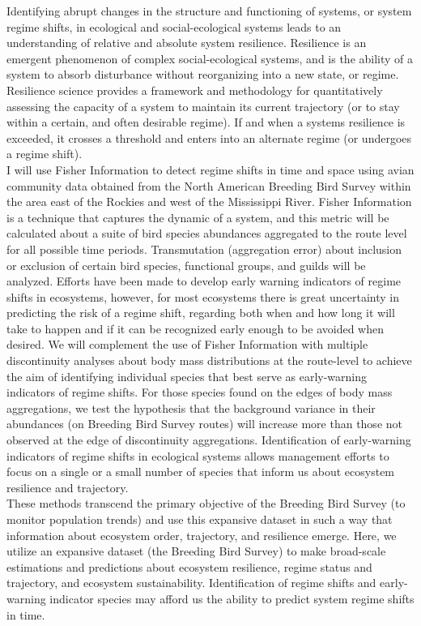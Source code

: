 \documentclass[12pt,twoside,openany]{reedthesis}
\begin{document}
Identifying abrupt changes in the structure and functioning of systems,
or system regime shifts, in ecological and social-ecological systems
leads to an understanding of relative and absolute system resilience.
Resilience is an emergent phenomenon of complex social-ecological
systems, and is the ability of a system to absorb disturbance without
reorganizing into a new state, or regime. Resilience science provides a
framework and methodology for quantitatively assessing the capacity of a
system to maintain its current trajectory (or to stay within a certain,
and often desirable regime). If and when a systems resilience is
exceeded, it crosses a threshold and enters into an alternate regime (or
undergoes a regime shift).\\
I will use Fisher Information to detect regime shifts in time and space
using avian community data obtained from the North American Breeding
Bird Survey within the area east of the Rockies and west of the
Mississippi River. Fisher Information is a technique that captures the
dynamic of a system, and this metric will be calculated about a suite of
bird species abundances aggregated to the route level for all possible
time periods. Transmutation (aggregation error) about inclusion or
exclusion of certain bird species, functional groups, and guilds will be
analyzed. Efforts have been made to develop early warning indicators of
regime shifts in ecosystems, however, for most ecosystems there is great
uncertainty in predicting the risk of a regime shift, regarding both
when and how long it will take to happen and if it can be recognized
early enough to be avoided when desired. We will complement the use of
Fisher Information with multiple discontinuity analyses about body mass
distributions at the route-level to achieve the aim of identifying
individual species that best serve as early-warning indicators of regime
shifts. For those species found on the edges of body mass aggregations,
we test the hypothesis that the background variance in their abundances
(on Breeding Bird Survey routes) will increase more than those not
observed at the edge of discontinuity aggregations. Identification of
early-warning indicators of regime shifts in ecological systems allows
management efforts to focus on a single or a small number of species
that inform us about ecosystem resilience and trajectory.\\
These methods transcend the primary objective of the Breeding Bird
Survey (to monitor population trends) and use this expansive dataset in
such a way that information about ecosystem order, trajectory, and
resilience emerge. Here, we utilize an expansive dataset (the Breeding
Bird Survey) to make broad-scale estimations and predictions about
ecosystem resilience, regime status and trajectory, and ecosystem
sustainability. Identification of regime shifts and early-warning
indicator species may afford us the ability to predict system regime
shifts in time.
\end{document}
